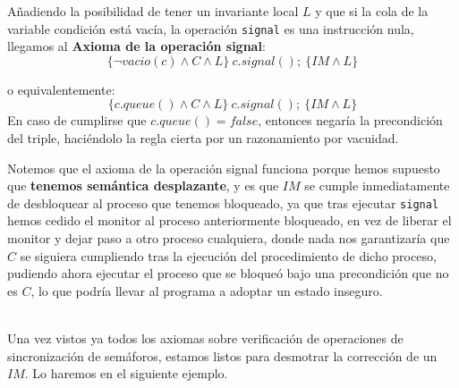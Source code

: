 Añadiendo la posibilidad de tener un invariante local $L$ y que si la cola de la variable condición está vacía, la operación \verb|signal| es una instrucción nula, llegamos al \textbf{Axioma de la operación signal}:
\begin{equation*}
    \{\lnot vacio(c) \land C \land L\}\ c.signal();\ \{IM \land L\}
\end{equation*}

o equivalentemente:
\begin{equation*}
    \{c.queue() \land C \land L\}\ c.signal();\ \{IM \land L\}
\end{equation*}
En caso de cumplirse que $c.queue() = false$, entonces negaría la precondición del triple, haciéndolo la regla cierta por un razonamiento por vacuidad.\\

\begin{observacion}
    Notemos que el axioma de la operación signal funciona porque hemos supuesto que \textbf{tenemos semántica desplazante}, y es que $IM$ se cumple inmediatamente de desbloquear al proceso que tenemos bloqueado, ya que tras ejecutar \verb|signal| hemos cedido el monitor al proceso anteriormente bloqueado, en vez de liberar el monitor y dejar paso a otro proceso cualquiera, donde nada nos garantizaría que $C$ se siguiera cumpliendo tras la ejecución del procedimiento de dicho proceso, pudiendo ahora ejecutar el proceso que se bloqueó bajo una precondición que no es $C$, lo que podría llevar al programa a adoptar un estado inseguro.
\end{observacion}~\\

Una vez vistos ya todos los axiomas sobre verificación de operaciones de sincronización de semáforos, estamos listos para desmotrar la corrección de un $IM$. Lo haremos en el siguiente ejemplo.

